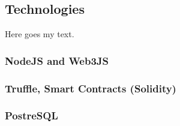 \subsection{Technologies}

Here goes my text.

\subsubsection{NodeJS and Web3JS}
\subsubsection{Truffle, Smart Contracts (Solidity)}
\subsubsection{PostreSQL}